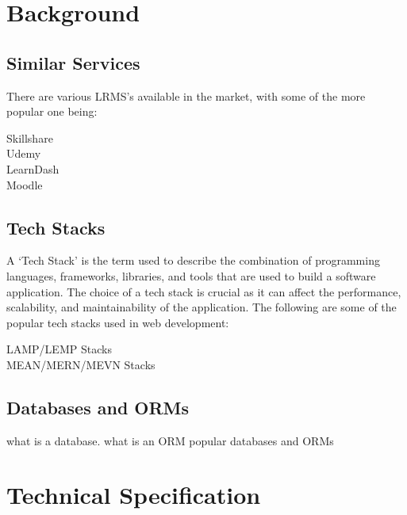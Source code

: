 \documentclass[12pt, a4paper,twoside]{report}
\theoremstyle{plain} %
\theoremstyle{definition} %
\numberwithin{equation}{chapter}
\begin{document}

\chapter{Background}\label{ch:background}

\section{Similar Services}\label{sec:similarservices}

There are various LRMS's available in the market, with some of the more popular
one being:

\begin{description}
    \item[Skillshare] {}
    \item[Udemy] {}
    \item[LearnDash] {}
    \item[Moodle] {}
\end{description}

\section{Tech Stacks}\label{sec:techstacks}

A `Tech Stack' is the term used to describe the combination of programming
languages, frameworks, libraries, and tools that are used to build a software
application. The choice of a tech stack is crucial as it can affect the
performance, scalability, and maintainability of the application. The following
are some of the popular tech stacks used in web development:

\begin{description}
    \item[LAMP/LEMP Stacks] {}
    \item[MEAN/MERN/MEVN Stacks] {}
\end{description}

\section{Databases and ORMs}\label{sec:databasesorms}

what is a database.
what is an ORM
popular databases and ORMs


\chapter{Technical Specification}\label{ch:techspec}
\end{document}

